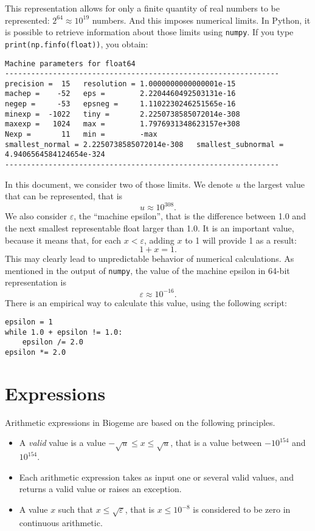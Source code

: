 \documentclass[12pt,a4paper]{article}
\begin{document}
This representation allows for only a finite quantity of real numbers to be represented: $2^{64} \approx 10^{19}$ numbers. And this imposes numerical limits. In Python, it is possible to retrieve information about those limits using \lstinline+numpy+. If you type \lstinline+print(np.finfo(float))+, you obtain:
\begin{lstlisting}
Machine parameters for float64
---------------------------------------------------------------
precision =  15   resolution = 1.0000000000000001e-15
machep =    -52   eps =        2.2204460492503131e-16
negep =     -53   epsneg =     1.1102230246251565e-16
minexp =  -1022   tiny =       2.2250738585072014e-308
maxexp =   1024   max =        1.7976931348623157e+308
Nexp =       11   min =        -max
smallest_normal = 2.2250738585072014e-308   smallest_subnormal = 4.9406564584124654e-324
---------------------------------------------------------------  
\end{lstlisting}

In this document, we consider two of those limits. We denote $u$ the largest value that can be represented, that is
\[
u \approx 10^{308}.
\]
We also consider $\varepsilon$, the ``machine epsilon'', that is the difference between 1.0 and the next smallest representable float larger than 1.0. It is an important value, because it means that, for each $x < \varepsilon$, adding $x$ to 1 will provide 1 as a result:
\[
1 + x = 1.
\]
This may clearly lead to unpredictable behavior of numerical calculations. As mentioned in the output of \lstinline+numpy+, the value of the machine epsilon in 64-bit representation is
\[
\varepsilon \approx 10^{-16}.
\]
There is an empirical way to calculate this value, using the following script:
\begin{lstlisting}
epsilon = 1
while 1.0 + epsilon != 1.0:
    epsilon /= 2.0
epsilon *= 2.0
\end{lstlisting}

\section{Expressions}

Arithmetic expressions in Biogeme are based on the following principles.
\begin{itemize}
\item A \emph{valid} value is a value $-\sqrt{u} \leq x \leq \sqrt{u}$, that is a value between $-10^{154}$ and $10^{154}$.
\item Each arithmetic expression takes as input one or several valid values, and returns a valid value or raises an exception.
\item A value $x$ such that $x \leq \sqrt{\varepsilon}$, that is $x \leq 10^{-8}$ is considered to be zero in continuous arithmetic.  
\end{itemize}
\end{document}
